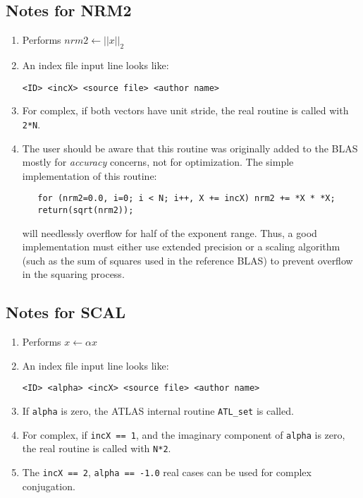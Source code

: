 \documentclass[11pt]{article}
\begin{document}
\subsection{Notes for NRM2}
\begin{enumerate}
\item Performs $nrm2 \leftarrow || x || _ {2} $
\item
An index file input line looks like:
\begin{verbatim}
<ID> <incX> <source file> <author name>
\end{verbatim}

\item
For complex, if both vectors have unit stride, the real routine is called
with {\tt 2*N}.

\item
The user should be aware that this routine was originally added to the BLAS
mostly for {\em accuracy} concerns, not for optimization.  The simple
implementation of this routine:
\begin{verbatim}
   for (nrm2=0.0, i=0; i < N; i++, X += incX) nrm2 += *X * *X;
   return(sqrt(nrm2));
\end{verbatim}
will needlessly overflow for half of the exponent range.  Thus, a good
implementation must either use extended precision or a scaling algorithm
(such as the sum of squares used in the reference BLAS) to prevent overflow
in the squaring process.

\end{enumerate}

\subsection{Notes for SCAL}
\begin{enumerate}
\item Performs $ x \leftarrow \alpha x $
\item An index file input line looks like:
\begin{verbatim}
<ID> <alpha> <incX> <source file> <author name>
\end{verbatim}
\item If {\tt alpha} is zero, the ATLAS internal routine {\tt ATL\_set}
      is called.
\item For complex, if {\tt incX == 1}, and the imaginary component of
      {\tt alpha} is zero, the real routine is called with {\tt N*2}.
\item The {\tt incX == 2}, {\tt alpha == -1.0} real cases can be used
      for complex conjugation.
\end{enumerate}
\end{document}
